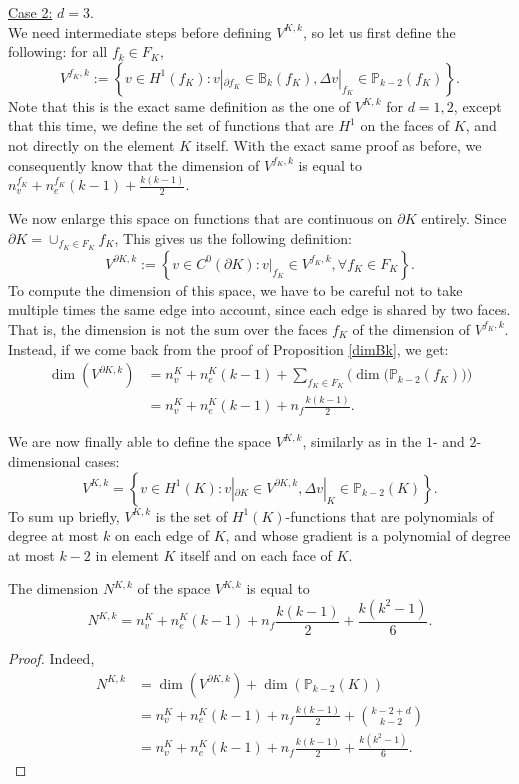 \noindent \underline{Case 2:} $d=3$. \\
\noindent We need intermediate steps before defining $V^{K,k}$, so let us first define the following: for all $f_k\in F_K$, 
$$V^{f_K,k} := \left\{v\in H^1(f_K) : v|_{\partial f_K} \in \mathbb{B}_k(f_K), \Delta v|_{f_K}\in \mathbb{P}_{k-2}(f_K)\right\}.$$
Note that this is the exact same definition as the one of $V^{K,k}$ for $d=1,2$, except that this time, we define the set of functions that are $H^1$ on the faces of $K$, and not directly on the element $K$ itself. With the exact same proof as before, we consequently know that the dimension of $V^{f_K,k}$ is equal to $n_v^{f_K} + n_e^{f_K}(k-1) + \frac{k(k-1)}{2}$. 

We now enlarge this space on functions that are continuous on $\partial K$ entirely. Since $\partial K = \cup_{f_K\in F_K}f_K$, This gives us the following definition:
$$V^{\partial K,k} := \left\{v\in C^0(\partial K) : v|_{f_K}\in V^{f_K,k}, \forall f_K\in F_K\right\}.$$
To compute the dimension of this space, we have to be careful not to take multiple times the same edge into account, since each edge is shared by two faces. That is, the dimension is not the sum over the faces $f_K$ of the dimension of $V^{f_K,k}$. Instead, if we come back from the proof of Proposition \ref{dimBk}, we get:
\begin{align*}
\dim\left(V^{\partial K, k}\right) &= n_v^K + n_e^K(k-1) + \sum_{f_K\in F_K}\Big(\dim\big(\mathbb{P}_{k-2} \left(f_K\right)\big)\Big)\\
&= n_v^K + n_e^K(k-1) + n_f\frac{k(k-1)}{2}.
\end{align*}

We are now finally able to define the space $V^{K,k}$, similarly as in the $1$- and $2$-dimensional cases:
$$V^{K,k} = \left\{v\in H^1(K):v|_{\partial K}\in V^{\partial K,k}, \Delta v|_K\in \mathbb{P}_{k-2}(K)\right\}.$$
To sum up briefly, $V^{K,k}$ is the set of $H^1(K)$-functions that are polynomials of degree at most $k$ on each edge of $K$, and whose gradient is a polynomial of degree at most $k-2$ in element $K$ itself and on each face of $K$. 

\begin{proposition}
The dimension $N^{K,k}$ of the space $V^{K,k}$ is equal to $$N^{K,k} = n_v^K + n_e^K(k-1) + n_f\frac{k(k-1)}{2} + \frac{k(k^2-1)}{6}.$$
\end{proposition}
\begin{proof}
Indeed, 
\begin{align*}
N^{K,k} &= \dim\left(V^{\partial K,k}\right) +  \dim\left(\mathbb{P}_{k-2}(K)\right)\\
&= n_v^K + n_e^K(k-1) + n_f\frac{k(k-1)}{2} + \binom{k-2+d}{k-2} \\
&= n_v^K + n_e^K(k-1) + n_f\frac{k(k-1)}{2} + \frac{k(k^2-1)}{6}.
\end{align*}
\end{proof}


